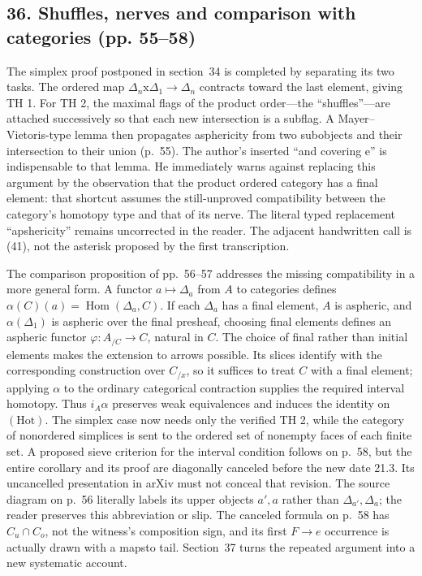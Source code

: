 \subsection*{36. Shuffles, nerves and comparison with categories (pp. 55--58)}
The simplex proof postponed in section~34 is completed by separating its two tasks. The ordered map $\Delta_n\mathrm{x}\Delta_1\to\Delta_n$ contracts toward the last element, giving TH 1. For TH 2, the maximal flags of the product order---the ``shuffles''---are attached successively so that each new intersection is a subflag. A Mayer--Vietoris-type lemma then propagates asphericity from two subobjects and their intersection to their union (p.~55). The author's inserted ``and covering e'' is indispensable to that lemma. He immediately warns against replacing this argument by the observation that the product ordered category has a final element: that shortcut assumes the still-unproved compatibility between the category's homotopy type and that of its nerve. The literal typed replacement ``apshericity'' remains uncorrected in the reader. The adjacent handwritten call is (41), not the asterisk proposed by the first transcription.

The comparison proposition of pp.~56--57 addresses the missing compatibility in a more general form. A functor $a\mapsto\Delta_a$ from $A$ to categories defines $\alpha(C)(a)=\operatorname{Hom}(\Delta_a,C)$. If each $\Delta_a$ has a final element, $A$ is aspheric, and $\alpha(\Delta_1)$ is aspheric over the final presheaf, choosing final elements defines an aspheric functor $\varphi:A_{/C}\to C$, natural in $C$. The choice of final rather than initial elements makes the extension to arrows possible. Its slices identify with the corresponding construction over $C_{/x}$, so it suffices to treat $C$ with a final element; applying $\alpha$ to the ordinary categorical contraction supplies the required interval homotopy. Thus $i_A\alpha$ preserves weak equivalences and induces the identity on $(\mathrm{Hot})$. The simplex case now needs only the verified TH 2, while the category of nonordered simplices is sent to the ordered set of nonempty faces of each finite set. A proposed sieve criterion for the interval condition follows on p.~58, but the entire corollary and its proof are diagonally canceled before the new date 21.3. Its uncancelled presentation in arXiv must not conceal that revision. The source diagram on p.~56 literally labels its upper objects $a',a$ rather than $\Delta_{a'},\Delta_a$; the reader preserves this abbreviation or slip. The canceled formula on p.~58 has $C_u\cap C_o$, not the witness's composition sign, and its first $F\to e$ occurrence is actually drawn with a mapsto tail. Section~37 turns the repeated argument into a new systematic account.



